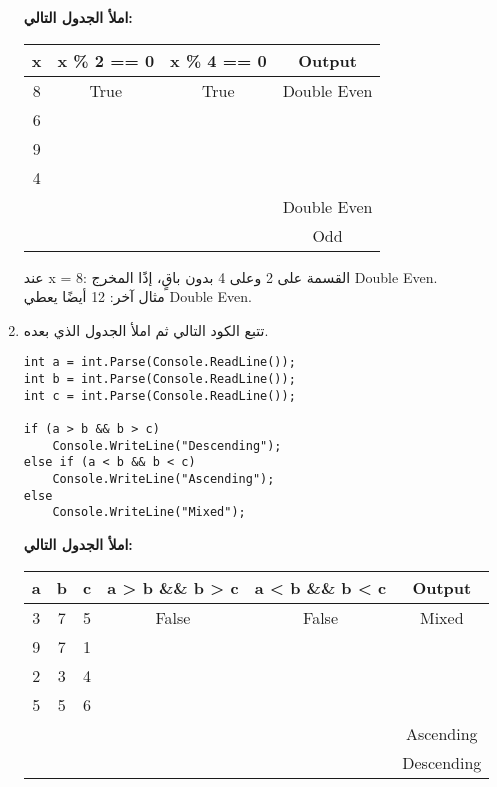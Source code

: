 \documentclass[12pt]{article}
\begin{document}
\begin{enumerate}[itemsep=2em]
\textbf{املأ الجدول التالي:}
\begin{center}
\begin{tabular}{|c|c|c|c|}
\hline
\textbf{x} & \textenglish{x \% 2 == 0} & \textenglish{x \% 4 == 0} & \textbf{Output} \\
\hline
8 & True & True & Double Even \\
\hline
6 &  &  &  \\
\hline
9 &  &  &  \\
\hline
4 &  &  &  \\
\hline
 &  &  & Double Even \\
\hline
 &  &  & Odd \\
\hline
\end{tabular}
\end{center}

\ifwithsols
\begin{boxSolution}
عند \textenglish{x = 8}: القسمة على 2 وعلى 4 بدون باقٍ، إذًا المخرج \textenglish{Double Even}.\\
مثال آخر: \textenglish{12} أيضًا يعطي \textenglish{Double Even}.
\end{boxSolution}
\fi

\item
تتبع الكود التالي ثم املأ الجدول الذي بعده.

\begin{boxCode}
\begin{english}
\begin{verbatim}
int a = int.Parse(Console.ReadLine());
int b = int.Parse(Console.ReadLine());
int c = int.Parse(Console.ReadLine());

if (a > b && b > c)
    Console.WriteLine("Descending");
else if (a < b && b < c)
    Console.WriteLine("Ascending");
else
    Console.WriteLine("Mixed");
\end{verbatim}
\end{english}
\end{boxCode}

\textbf{املأ الجدول التالي:}

\begin{center}
\begin{tabular}{|c|c|c|c|c|c|}
\hline
\textbf{a} & \textbf{b} & \textbf{c} & \textenglish{a > b \&\& b > c} & \textenglish{a < b \&\& b < c} & \textbf{Output} \\
\hline
3 & 7 & 5 & False & False & Mixed \\
\hline
9 & 7 & 1 &  &  &  \\
\hline
2 & 3 & 4 &  &  &  \\
\hline
5 & 5 & 6 &  &  &  \\
\hline
 &  &  &  &  & Ascending \\
\hline
 &  &  &  &  & Descending \\
\hline
\end{tabular}
\end{center}


\end{enumerate}
\end{document}
